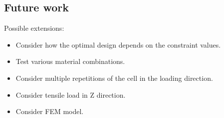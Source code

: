 \subsection{Future work}
Possible extensions:
\begin{itemize}
	\item Consider how the optimal design depends on the constraint values.
	\item Test various material combinations.
	\item Consider multiple repetitions of the cell in the loading direction.
	\item Consider tensile load in Z direction.
	\item Consider FEM model.
\end{itemize}

